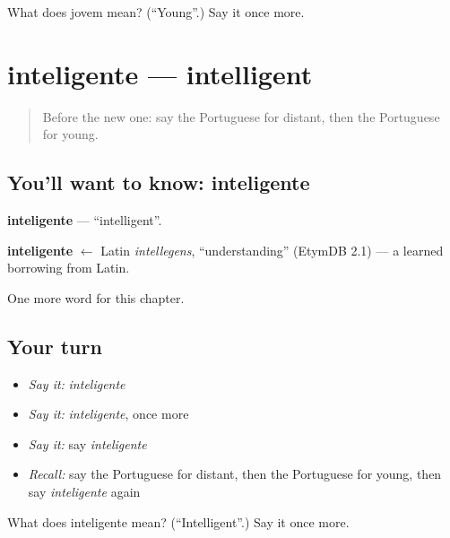 \begin{tcolorbox}[breakable,colback=teal!4,colframe=teal!35!black,title={Before you move on}]
What does jovem mean? (\textquotedblleft{}Young\textquotedblright{}.) Say it once more.
\end{tcolorbox}
\section[inteligente]{inteligente — intelligent}

\label{lesson:PT-C243-inteligente}



\begin{quote}
Before the new one: say the Portuguese for distant, then the Portuguese for young.
\end{quote}

\subsection*{You'll want to know: inteligente}
\textbf{inteligente} — \textquotedblleft{}intelligent\textquotedblright{}.

\begin{cousinweb}
\textbf{inteligente} $\leftarrow$ Latin \emph{intellegens}, \textquotedblleft{}understanding\textquotedblright{} (EtymDB 2.1) — a learned borrowing from Latin.
\end{cousinweb}

\begin{grammarlens}[title={What you've built}]
One more word for this chapter.
\end{grammarlens}

\subsection*{Your turn}
\begin{itemize}
\raggedright
  \item \emph{Say it:} \emph{inteligente}
  \item \emph{Say it:} \emph{inteligente}, once more
  \item \emph{Say it:} say \emph{inteligente}
  \item \emph{Recall:} say the Portuguese for distant, then the Portuguese for young, then say \emph{inteligente} again
\end{itemize}

\begin{tcolorbox}[breakable,colback=teal!4,colframe=teal!35!black,title={Before you move on}]
What does inteligente mean? (\textquotedblleft{}Intelligent\textquotedblright{}.) Say it once more.
\end{tcolorbox}
